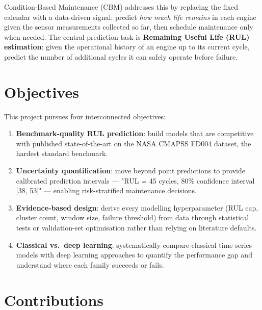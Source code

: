 \documentclass[12pt,a4paper]{report}
\begin{document}
Condition-Based Maintenance (CBM) addresses this by replacing the fixed calendar with a data-driven signal: predict \textit{how much life remains} in each engine given the sensor measurements collected so far, then schedule maintenance only when needed. The central prediction task is \textbf{Remaining Useful Life (RUL) estimation}: given the operational history of an engine up to its current cycle, predict the number of additional cycles it can safely operate before failure.

\section{Objectives}

This project pursues four interconnected objectives:

\begin{enumerate}[leftmargin=1.5cm]
  \item \textbf{Benchmark-quality RUL prediction}: build models that are competitive with published state-of-the-art on the NASA CMAPSS FD004 dataset, the hardest standard benchmark.
  \item \textbf{Uncertainty quantification}: move beyond point predictions to provide calibrated prediction intervals — "RUL = 45 cycles, 80\% confidence interval [38, 53]" — enabling risk-stratified maintenance decisions.
  \item \textbf{Evidence-based design}: derive every modelling hyperparameter (RUL cap, cluster count, window size, failure threshold) from data through statistical tests or validation-set optimisation rather than relying on literature defaults.
  \item \textbf{Classical vs.\ deep learning}: systematically compare classical time-series models with deep learning approaches to quantify the performance gap and understand where each family succeeds or fails.
\end{enumerate}

\section{Contributions}
\end{document}
